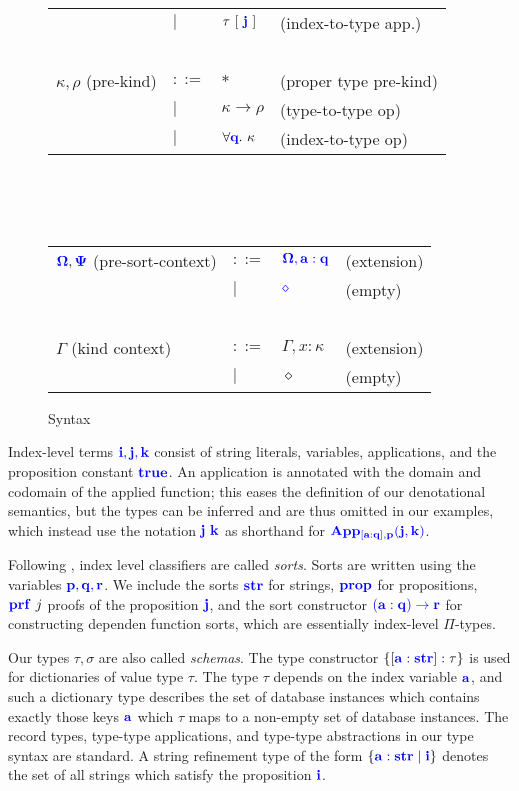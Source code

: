 \documentclass[sigplan,10pt,review,anonymous]{acmart}
\newcommand{\blu}[1]{\textbf{\color{blue}{#1}}}
\newcommand{\blum}[1]{\mathbf{\color{blue}{#1}}}
\begin{document}
\begin{figure}
\begin{tabular}{llll}
       & $\mid$ & $\tau~[~\blu{j}~]$ & (index-to-type app.)\\
~ & ~ & ~ & ~ \\
$\kappa,\rho$ (pre-kind) & $::=$ & $\ast$ & (proper type pre-kind) \\
                     & $\mid$ & $\kappa \to \rho$ & (type-to-type op)\\
                     & $\mid$ & $\forall \blu{q}.~\kappa$ & (index-to-type op)
\end{tabular}\\~\\~\\
\begin{tabular}{llll}
$\blum{\Omega}, \blum{\Psi}$ (pre-sort-context) & $::=$  & $\blum{\Omega,a : q}$ & (extension) \\
                                     & $\mid$ & $\blum{\diamond}$ & (empty) \\~\\
$\Gamma$ (kind context) & $::=$ & $\Gamma,x : \kappa$ & (extension) \\
                        & $\mid$ & $\diamond$ & (empty) 
\end{tabular}
\caption{Syntax}
\label{fig:syntax}
\end{figure}

Index-level terms $\blum{i,j,k}$ consist of string literals, variables, applications, and the proposition constant $\blum{true}$. An application is annotated with the domain and codomain of the applied function; this eases the definition of our denotational semantics, but the types can be inferred and are thus omitted in our examples, which instead use the notation $\blum{j}~\blum{k}$ as shorthand for $\blum{App_{[a : q], p}(j,k)}$.

Following \cite{xi2007dependent}, index level classifiers are called \emph{sorts}. Sorts are written using the variables $\blum{p,q,r}$. We include the sorts $\blum{str}$ for strings, $\blum{prop}$ for propositions, $\blum{prf}~j$ proofs of the proposition $\blum{j}$, and the sort constructor $\blum{(a : q) \to r}$ for constructing dependen function sorts, which are essentially index-level $\Pi$-types.

Our types $\tau,\sigma$ are also called \emph{schemas}. The type constructor $\{ [\blum{a : str}] : \tau \}$ is used for dictionaries of value type $\tau$. The type $\tau$ depends on the index variable $\blum{a}$, and such a dictionary type describes the set of database instances which contains exactly those keys $\blum{a}$ which $\tau$ maps to a non-empty set of database instances. The record types, type-type applications, and type-type abstractions in our type syntax are standard. A string refinement type of the form $\{ \blum{a : str} \mid \blum{i} \}$ denotes the set of all strings which satisfy the proposition $\blum{i}$.
\end{document}
